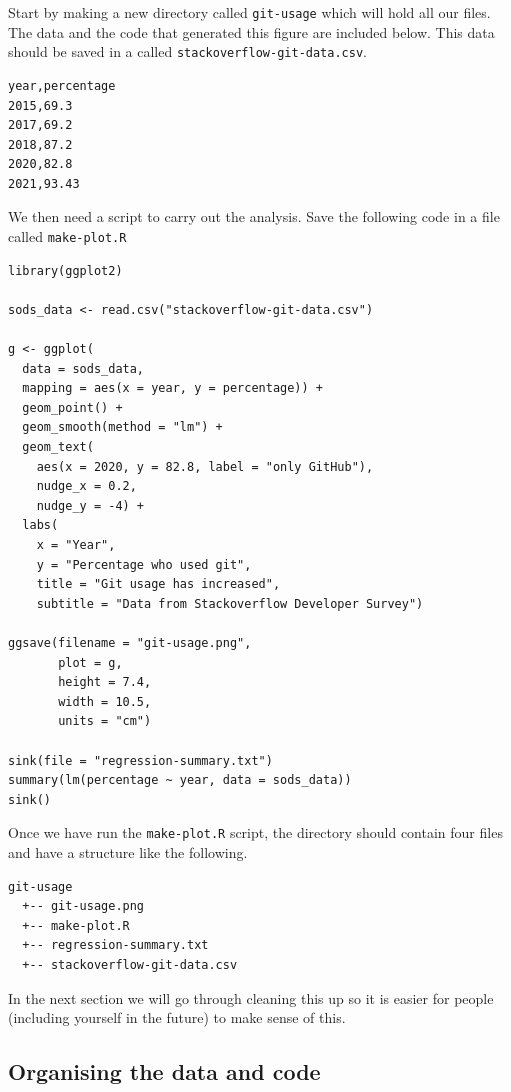\documentclass[11pt,onecolumn]{scrartcl}
\begin{document}
Start by making a new directory called \texttt{git-usage} which will hold all our
files. The data and the code that generated this figure are included below. This
data should be saved in a called \texttt{stackoverflow-git-data.csv}.

\begin{Verbatim}[frame=single,framerule=0.5mm,framesep=2mm,label=Git Usage,xleftmargin=5cm,xrightmargin=5cm]
year,percentage
2015,69.3
2017,69.2
2018,87.2
2020,82.8
2021,93.43
\end{Verbatim}

We then need a script to carry out the analysis. Save the following code in a
file called \texttt{make-plot.R}

\lstset{language=r,label= ,caption= ,captionpos=b,numbers=none}
\begin{lstlisting}
library(ggplot2)

sods_data <- read.csv("stackoverflow-git-data.csv")

g <- ggplot(
  data = sods_data,
  mapping = aes(x = year, y = percentage)) +
  geom_point() +
  geom_smooth(method = "lm") +
  geom_text(
    aes(x = 2020, y = 82.8, label = "only GitHub"),
    nudge_x = 0.2,
    nudge_y = -4) +
  labs(
    x = "Year",
    y = "Percentage who used git",
    title = "Git usage has increased",
    subtitle = "Data from Stackoverflow Developer Survey")

ggsave(filename = "git-usage.png",
       plot = g,
       height = 7.4,
       width = 10.5,
       units = "cm")

sink(file = "regression-summary.txt")
summary(lm(percentage ~ year, data = sods_data))
sink()
\end{lstlisting}

Once we have run the \texttt{make-plot.R} script, the directory should contain four files
and have a structure like the following.

\begin{Verbatim}[frame=single,framerule=0.5mm,framesep=2mm,label=Directory contents,xleftmargin=3cm,xrightmargin=3cm]
  git-usage
  +-- git-usage.png
  +-- make-plot.R
  +-- regression-summary.txt
  +-- stackoverflow-git-data.csv
\end{Verbatim}

In the next section we will go through cleaning this up so it is easier for
people (including yourself in the future) to make sense of this.

\subsection{Organising the data and code}
\label{sec:org3ae4977}
\end{document}
